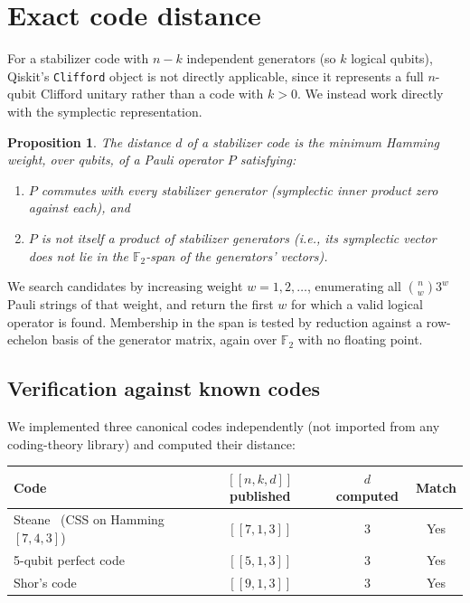 \documentclass[11pt]{article}
\newtheorem{proposition}[theorem]{Proposition}
\newcommand{\GF}{\mathbb{F}_2}
\begin{document}
\section{Exact code distance}

For a stabilizer code with $n-k$ independent generators (so $k$ logical
qubits), Qiskit's \texttt{Clifford} object is not directly applicable,
since it represents a full $n$-qubit Clifford unitary rather than a code
with $k>0$. We instead work directly with the symplectic representation.

\begin{proposition}
The distance $d$ of a stabilizer code is the minimum Hamming weight,
over qubits, of a Pauli operator $P$ satisfying:
\begin{enumerate}
\item $P$ commutes with every stabilizer generator (symplectic inner
  product zero against each), and
\item $P$ is not itself a product of stabilizer generators (i.e., its
  symplectic vector does not lie in the $\GF$-span of the generators'
  vectors).
\end{enumerate}
\end{proposition}

We search candidates by increasing weight $w = 1, 2, \ldots$, enumerating
all $\binom{n}{w} 3^w$ Pauli strings of that weight, and return the first
$w$ for which a valid logical operator is found. Membership in the span
is tested by reduction against a row-echelon basis of the generator
matrix, again over $\GF$ with no floating point.

\subsection{Verification against known codes}

We implemented three canonical codes independently (not imported from
any coding-theory library) and computed their distance:

\begin{center}
\begin{tabular}{lccc}
Code & $[[n,k,d]]$ published & $d$ computed & Match \\
\hline
Steane~\cite{Steane1996} (CSS on Hamming $[7,4,3]$) & $[[7,1,3]]$ & 3 & Yes \\
5-qubit perfect code~\cite{Laflamme1996,Bennett1996} & $[[5,1,3]]$ & 3 & Yes \\
Shor's code~\cite{Shor1995} & $[[9,1,3]]$ & 3 & Yes \\
\end{tabular}
\end{center}
\end{document}
